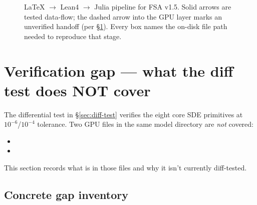 \documentclass[11pt,a4paper]{article}
\begin{document}
\begin{figure}[ht]
\caption{LaTeX $\to$ Lean4 $\to$ Julia pipeline for FSA v1.5. Solid
arrows are tested data-flow; the dashed arrow into the GPU layer marks
an unverified handoff (per \S\ref{sec:gap}). Every box names the
on-disk file path needed to reproduce that stage.}
\label{fig:pipeline}
\end{figure}


\section{Verification gap --- what the diff test does NOT cover}
\label{sec:gap}

The differential test in \S\ref{sec:diff-test} verifies the eight
core SDE primitives at $10^{-6}$/$10^{-4}$ tolerance. Two GPU files
in the same model directory are \emph{not} covered:

\begin{itemize}[itemsep=2pt]
  \item {}
  \item {}
\end{itemize}

This section records what is in those files and why it isn't currently
diff-tested.

\subsection{Concrete gap inventory}
\end{document}
